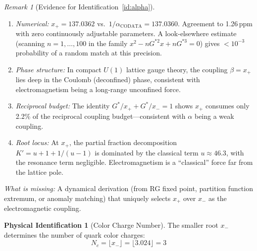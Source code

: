 \documentclass[12pt]{article}
\theoremstyle{definition}
\newtheorem{identification}[theorem]{Physical Identification}
\theoremstyle{remark}
\newtheorem{remark}[theorem]{Remark}
\begin{document}
\begin{remark}[Evidence for Identification~\ref{id:alpha}]
\mbox{}
\begin{enumerate}[nosep]
    \item \emph{Numerical:} $x_+ = 137.0362$ vs.\ $1/\alpha_{\mathrm{CODATA}} = 137.0360$. Agreement to 1.26\,ppm with zero continuously adjustable parameters. A look-elsewhere estimate (scanning $n = 1, \ldots, 100$ in the family $x^2 - nG^{*2}x + nG^{*3} = 0$) gives $< 10^{-3}$ probability of a random match at this precision.
    \item \emph{Phase structure:} In compact $U(1)$ lattice gauge theory, the coupling $\beta = x_+$ lies deep in the Coulomb (deconfined) phase, consistent with electromagnetism being a long-range unconfined force.
    \item \emph{Reciprocal budget:} The identity $G^*/x_+ + G^*/x_- = 1$ shows $x_+$ consumes only 2.2\% of the reciprocal coupling budget---consistent with $\alpha$ being a weak coupling.
    \item \emph{Root locus:} At $x_+$, the partial fraction decomposition $K' = u + 1 + 1/(u-1)$ is dominated by the classical term $u \approx 46.3$, with the resonance term negligible. Electromagnetism is a ``classical'' force far from the lattice pole.
\end{enumerate}
\emph{What is missing:} A dynamical derivation (from RG fixed point, partition function extremum, or anomaly matching) that uniquely selects $x_+$ over $x_-$ as the electromagnetic coupling.
\end{remark}

\begin{identification}[Color Charge Number]
\label{id:nc}
The smaller root $x_-$ determines the number of quark color charges:
\begin{equation}
    \boxed{\;N_c = \lfloor x_- \rfloor = \lfloor 3.024 \rfloor = 3\;}
\end{equation}
\end{identification}
\end{document}
